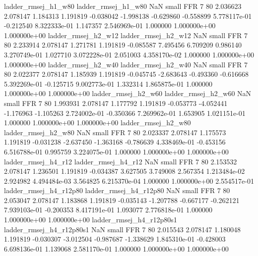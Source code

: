      ladder_rmsej_h1_w80      ladder_rmsej_h1_w80                   NaN      small      FFR                 7 80 2.036623       2.078147 1.184313       1.191819   -0.038042     -1.998138     -0.629860    -0.558899   5.778117e-01 -0.212540 8.322333e-01     1.147357   2.546969e-01            1.000000    1.000000e+00        1.000000e+00
     ladder_rmsej_h2_w12      ladder_rmsej_h2_w12                   NaN      small      FFR                 7 80 2.233914       2.078147 1.271781       1.191819   -0.085587      7.495456      6.709209     0.986140   3.270749e-01  1.027710 3.072228e-01     2.051003   4.358170e-02            1.000000    1.000000e+00        1.000000e+00
     ladder_rmsej_h2_w40      ladder_rmsej_h2_w40                   NaN      small      FFR                 7 80 2.022377       2.078147 1.185939       1.191819   -0.045745     -2.683643     -0.493360    -0.616668   5.392269e-01 -0.125715 9.002773e-01     1.332314   1.865875e-01            1.000000    1.000000e+00        1.000000e+00
     ladder_rmsej_h2_w60      ladder_rmsej_h2_w60                   NaN      small      FFR                 7 80 1.993931       2.078147 1.177792       1.191819   -0.053773     -4.052441     -1.176963    -1.105263   2.724002e-01 -0.350366 7.269962e-01     1.653905   1.021151e-01            1.000000    1.000000e+00        1.000000e+00
     ladder_rmsej_h2_w80      ladder_rmsej_h2_w80                   NaN      small      FFR                 7 80 2.023337       2.078147 1.175573       1.191819   -0.031238     -2.637450     -1.363168    -0.786639   4.338469e-01 -0.453156 6.516788e-01     0.995759   3.224075e-01            1.000000    1.000000e+00        1.000000e+00
     ladder_rmsej_h4_r12      ladder_rmsej_h4_r12                   NaN      small      FFR                 7 80 2.153532       2.078147 1.236501       1.191819   -0.034387      3.627505      3.749008     2.567354   1.213484e-02  2.924982 4.494484e-03     3.564825   6.215370e-04            1.000000    1.000000e+00        2.554517e-01
  ladder_rmsej_h4_r12p80   ladder_rmsej_h4_r12p80                   NaN      small      FFR                 7 80 2.053047       2.078147 1.183868       1.191819   -0.035143     -1.207788     -0.667177    -0.262121   7.939103e-01 -0.200353 8.417191e-01     1.093077   2.776818e-01            1.000000    1.000000e+00        1.000000e+00
ladder_rmsej_h4_r12p80s1 ladder_rmsej_h4_r12p80s1                   NaN      small      FFR                 7 80 2.015543       2.078147 1.180048       1.191819   -0.030307     -3.012504     -0.987687    -1.338629   1.845310e-01 -0.428003 6.698136e-01     1.139068   2.581170e-01            1.000000    1.000000e+00        1.000000e+00

